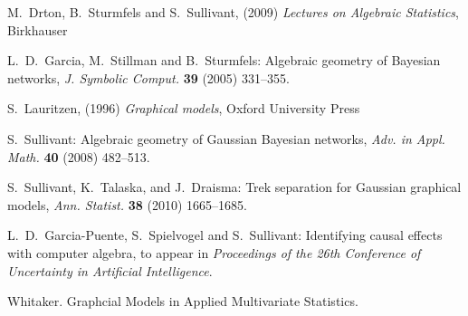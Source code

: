 \documentclass[letterpaper]{article}
\theoremstyle{definition}
\begin{document}
\begin{thebibliography}{20}


M.~Drton, B.~Sturmfels and S.~Sullivant, (2009) \emph{Lectures on Algebraic Statistics}, Birkhauser 


 L.~D.~Garcia, M.~Stillman and B.~Sturmfels: Algebraic geometry of Bayesian networks, {\em J. Symbolic Comput.}
  {\bf 39} (2005) 331--355.
  


S.~Lauritzen,  (1996) \emph{Graphical models}, Oxford University Press


 S.~Sullivant: Algebraic geometry of Gaussian Bayesian
  networks, {\em Adv. in Appl. Math.} {\bf 40} (2008) 482--513.

S.~Sullivant, K.~Talaska, and J.~Draisma: Trek separation for Gaussian
graphical models, {\em Ann. Statist.} {\bf 38} (2010) 1665--1685. 

 L.~D.~Garcia-Puente, S.~Spielvogel and S.~Sullivant: Identifying
causal effects with computer algebra, to appear in {\em Proceedings of the 26th
Conference of Uncertainty in Artificial Intelligence}.

  Whitaker.  Graphcial Models in Applied Multivariate Statistics.

\end{thebibliography}
\end{document}
